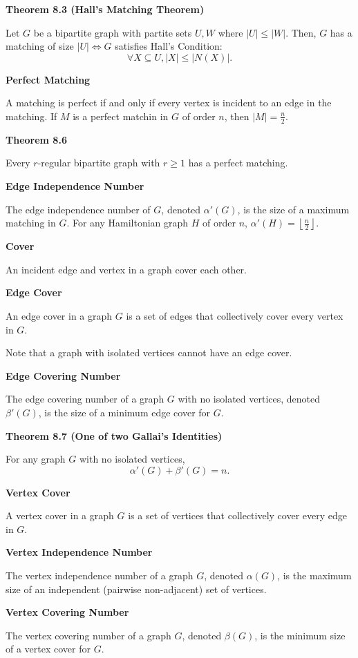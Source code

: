 \documentclass{article}
\begin{document}
\medskip\noindent\textbf{Theorem 8.3 (Hall's Matching Theorem)}

	Let $G$ be a bipartite graph with partite sets $U,W$ where $|U| \leq |W|$.
	Then, $G$ has a matching of size $|U| \iff G$ satisfies Hall's Condition: $$\forall X \subseteq U, |X| \leq |N(X)|.$$

\medskip\noindent\textbf{Perfect Matching}

	A matching is perfect if and only if every vertex is incident to an edge in the matching. If $M$ is a perfect matchin in $G$ of order $n$, then $|M| = \frac n2$.

\medskip\noindent\textbf{Theorem 8.6}

	Every $r$-regular bipartite graph with $r \geq 1$ has a perfect matching.

\medskip\noindent\textbf{Edge Independence Number}

	The edge independence number of $G$, denoted $\alpha'(G)$, is the size of a maximum matching in $G$.
	For any Hamiltonian graph $H$ of order $n$, $\alpha'(H) = \left\lfloor \frac n2 \right\rfloor$.

\medskip\noindent\textbf{Cover}

	An incident edge and vertex in a graph cover each other.

\medskip\noindent\textbf{Edge Cover}

	An edge cover in a graph $G$ is a set of edges that collectively cover every vertex in $G$.

	Note that a graph with isolated vertices cannot have an edge cover.

\medskip\noindent\textbf{Edge Covering Number}

	The edge covering number of a graph $G$ with no isolated vertices, denoted $\beta'(G)$, is the size of a minimum edge cover for $G$.

\medskip\noindent\textbf{Theorem 8.7 (One of two Gallai's Identities)}

	For any graph $G$ with no isolated vertices, $$\alpha'(G) + \beta'(G) = n.$$

\medskip\noindent\textbf{Vertex Cover}

	A vertex cover in a graph $G$ is a set of vertices that collectively cover every edge in $G$.

\medskip\noindent\textbf{Vertex Independence Number}

	The vertex independence number of a graph $G$, denoted $\alpha(G)$, is the maximum size of an independent (pairwise non-adjacent) set of vertices.

\medskip\noindent\textbf{Vertex Covering Number}

	The vertex covering number of a graph $G$, denoted $\beta(G)$, is the minimum size of a vertex cover for $G$.
\end{document}
